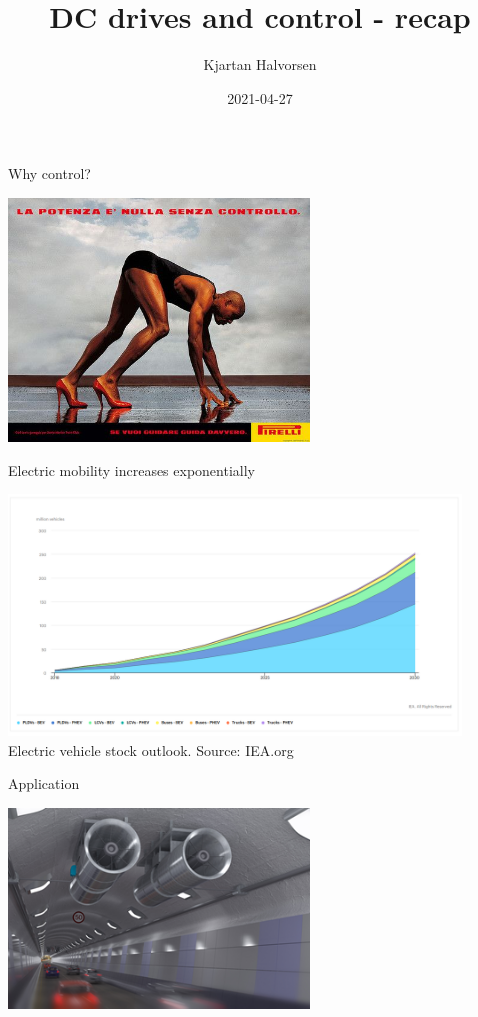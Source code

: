 \documentclass[dvisvgm,hypertex,aspectratio=169]{beamer}
\author{Kjartan Halvorsen}
\date{2021-04-27}
\title{DC drives and control - recap}
\begin{document}
\maketitle


\begin{frame}[label=I0]{Why control?}
  \begin{center}
    \includegraphics[width=8cm]{pirelli.jpg}
  \end{center}
  
\end{frame}

\begin{frame}[label=I1]{Electric mobility increases exponentially}
  \begin{center}
    \includegraphics[width=12cm]{ev-scenario-2018-2030.png}\\
    Electric vehicle stock outlook. Source: IEA.org
  \end{center}
  
\end{frame}

\note{%
  
}

\begin{frame}[label=L0]{Application}
  \begin{center}
    \includegraphics[width=8cm]{fan.png}
  \end{center}

\end{frame}
\end{document}
